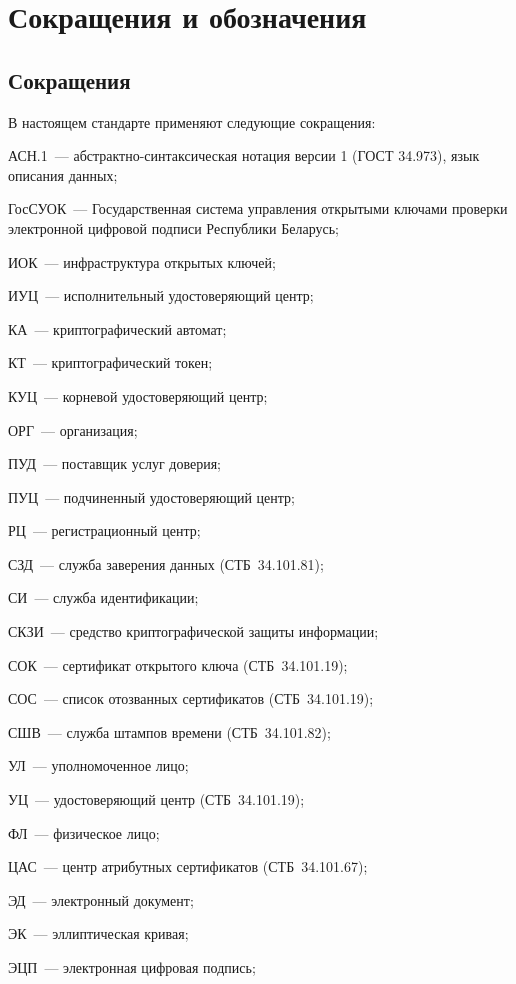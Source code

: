 \chapter{Сокращения и обозначения}\label{DEFS}

\section{Сокращения}

В настоящем стандарте применяют следующие сокращения:

АСН.1~--- абстрактно-синтаксическая нотация версии 1 (ГОСТ 34.973), 
язык описания данных;

ГосСУОК~--- Государственная система управления открытыми ключами 
проверки электронной цифровой подписи Республики Беларусь; 

ИОК~--- инфраструктура открытых ключей;

ИУЦ~--- исполнительный удостоверяющий центр;

КА~--- криптографический автомат;

КТ~--- криптографический токен;

КУЦ~--- корневой удостоверяющий центр;

ОРГ~--- организация;

ПУД~--- поставщик услуг доверия;

ПУЦ~--- подчиненный удостоверяющий центр;

РЦ~--- регистрационный центр;

СЗД~--- служба заверения данных (СТБ~34.101.81);

СИ~--- служба идентификации;

СКЗИ~--- средство криптографической защиты информации;

СОК~--- сертификат открытого ключа (СТБ~34.101.19);

СОС~--- список отозванных сертификатов (СТБ~34.101.19);

СШВ~--- служба штампов времени (СТБ~34.101.82);

УЛ~--- уполномоченное лицо;

УЦ~--- удостоверяющий центр (СТБ~34.101.19);

ФЛ~--- физическое лицо;

ЦАС~--- центр атрибутных сертификатов (СТБ~34.101.67);

ЭД~--- электронный документ;

ЭК~--- эллиптическая кривая;

ЭЦП~--- электронная цифровая подпись;

